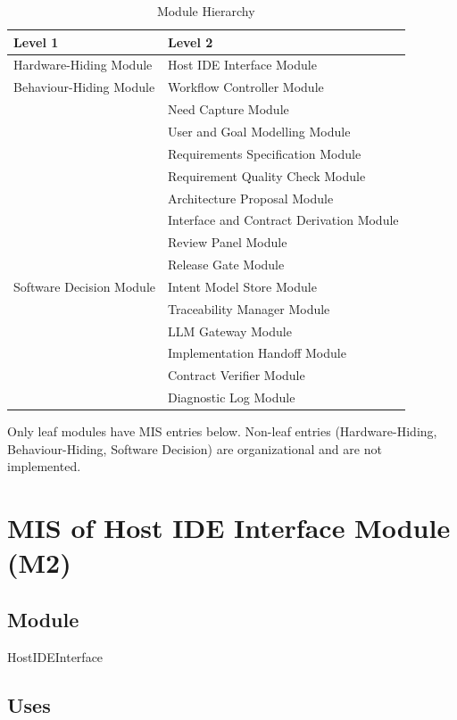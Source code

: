 \documentclass[12pt, titlepage]{article}
\begin{document}
\begin{table}[H]
\centering
\begin{tabular}{p{} p{}}
\toprule
\textbf{Level 1} & \textbf{Level 2}\\
\midrule
Hardware-Hiding Module & Host IDE Interface Module\\
\midrule
Behaviour-Hiding Module & Workflow Controller Module\\
 & Need Capture Module\\
 & User and Goal Modelling Module\\
 & Requirements Specification Module\\
 & Requirement Quality Check Module\\
 & Architecture Proposal Module\\
 & Interface and Contract Derivation Module\\
 & Review Panel Module\\
 & Release Gate Module\\
\midrule
Software Decision Module & Intent Model Store Module\\
 & Traceability Manager Module\\
 & LLM Gateway Module\\
 & Implementation Handoff Module\\
 & Contract Verifier Module\\
 & Diagnostic Log Module\\
\bottomrule
\end{tabular}
\caption{Module Hierarchy}
\label{TblMH}
\end{table}

Only leaf modules have MIS entries below. Non-leaf entries (Hardware-Hiding,
Behaviour-Hiding, Software Decision) are organizational and are not implemented.

\newpage
\section{MIS of Host IDE Interface Module (M2)} \label{MISHost}

\subsection{Module}

HostIDEInterface

\subsection{Uses}
\end{document}
